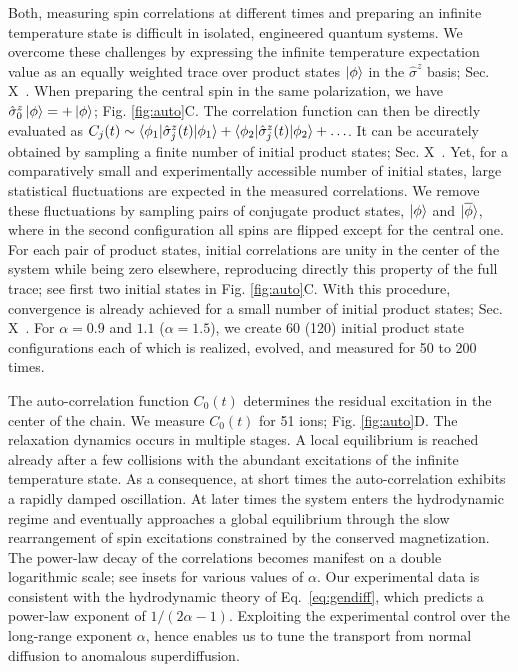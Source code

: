 \documentclass[aps,10pt,reprint,groupedaddress,superscriptaddress]{revtex4-2}
\begin{document}
Both, measuring spin correlations at different times and preparing an infinite temperature state is difficult in isolated, engineered quantum systems. We overcome these challenges by expressing the infinite temperature expectation value as an equally weighted trace over product states $\ket{\phi}$ in the $\hat\sigma^z$ basis; Sec. X~\cite{SI}. When preparing the central spin in the same polarization, we have $\hat \sigma_0^z\ket{\phi} = + \ket{\phi}$; Fig. \ref{fig:auto}C. The correlation function can then be directly evaluated as $C_j(t) \sim \braket{\phi_1| \hat\sigma_j^z(t)| \phi_1}  +\braket{\phi_2| \hat\sigma_j^z(t)| \phi_2}  + \ldots$. It can be accurately obtained by sampling a finite number of initial product states; Sec. X~\cite{SI}. Yet, for a comparatively small and experimentally accessible number of initial states, large statistical fluctuations are expected in the measured correlations. We remove these fluctuations by sampling pairs of conjugate product states, $\ket{\phi}$ and $\ket{\overline{\phi}}$, where in the second configuration all spins are flipped except for the central one. For each pair of product states, initial correlations are unity in the center of the system while being zero elsewhere, reproducing directly this property of the full trace; see first two initial states in Fig. \ref{fig:auto}C. With this procedure, convergence is already achieved for a small number of initial product states; Sec. X~\cite{SI}. For $\alpha=0.9$ and $1.1$ ($\alpha =1.5$), we create 60 (120) initial product state configurations each of which is realized, evolved, and measured for 50 to 200 times.  


The auto-correlation function $C_0(t)$  determines the residual excitation in the center of the chain. We measure $C_0(t)$ for 51 ions; 
Fig. \ref{fig:auto}D. The relaxation dynamics occurs in multiple stages. A local equilibrium is reached already after a few collisions with the abundant excitations of the infinite temperature state. As a consequence, at short times the auto-correlation exhibits a rapidly damped oscillation. At later times the system enters the hydrodynamic regime and eventually approaches a global equilibrium through the slow rearrangement of spin excitations constrained by the conserved magnetization. The power-law decay of the correlations becomes manifest
on a double logarithmic scale; see insets for various values of $\alpha$. Our experimental data is consistent with the hydrodynamic theory of Eq.~\eqref{eq:gendiff}, which predicts a power-law exponent of $1/(2\alpha-1)$. Exploiting the 
experimental control over the long-range exponent $\alpha$, hence enables us to tune the transport from normal diffusion to anomalous superdiffusion. 
\end{document}
